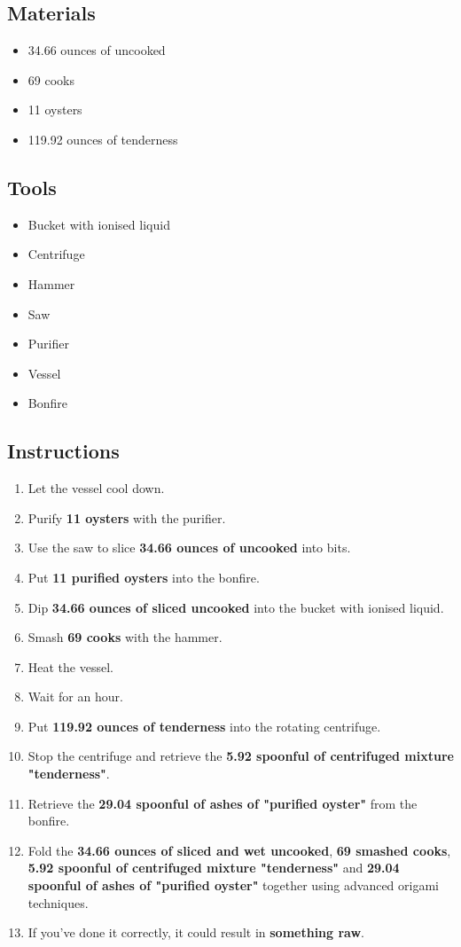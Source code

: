 \documentclass{article}
\begin{document}
\subsection{Materials}\begin{itemize}
\item 
34.66 ounces of uncooked
\item 
69 cooks
\item 
11 oysters
\item 
119.92 ounces of tenderness
\end{itemize}
\subsection{Tools}\begin{itemize}
\item 
Bucket with ionised liquid
\item 
Centrifuge
\item 
Hammer
\item 
Saw
\item 
Purifier
\item 
Vessel
\item 
Bonfire
\end{itemize}
\subsection{Instructions}\begin{enumerate}
\item 
Let the vessel cool down.
\item 
Purify \textbf{11 oysters} with the purifier.
\item 
Use the saw to slice \textbf{34.66 ounces of uncooked} into bits.
\item 
Put \textbf{11 purified oysters} into the bonfire.
\item 
Dip \textbf{34.66 ounces of sliced uncooked} into the bucket with ionised liquid.
\item 
Smash \textbf{69 cooks} with the hammer.
\item 
Heat the vessel.
\item 
Wait for an hour.
\item 
Put \textbf{119.92 ounces of tenderness} into the rotating centrifuge.
\item 
Stop the centrifuge and retrieve the \textbf{5.92 spoonful of centrifuged mixture "tenderness"}.
\item 
Retrieve the \textbf{29.04 spoonful of ashes of "purified oyster"} from the bonfire.
\item 
Fold the \textbf{34.66 ounces of sliced and wet uncooked}, \textbf{69 smashed cooks}, \textbf{5.92 spoonful of centrifuged mixture "tenderness"} and \textbf{29.04 spoonful of ashes of "purified oyster"} together using advanced origami techniques.
\item 
If you've done it correctly, it could result in \textbf{something raw}.
\end{enumerate}
\newpage
\end{document}
